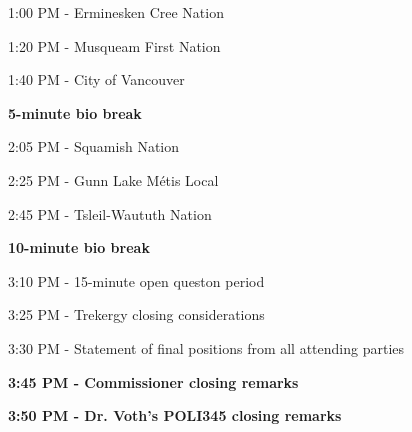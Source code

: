 \documentclass[12pt, letterpaper]{article}
\begin{document}
\vspace{12pt}

\hphantom{~~~~} 1:00 PM - Erminesken Cree Nation

\vspace{12pt}

\hphantom{~~~~} 1:20 PM - Musqueam First Nation

\vspace{12pt}

\hphantom{~~~~} 1:40 PM - City of Vancouver

\vspace{12pt}

{\bf 5-minute bio break}

\vspace{12pt}

\hphantom{~~~~} 2:05 PM - Squamish Nation

\vspace{12pt}

\hphantom{~~~~} 2:25 PM - Gunn Lake M\'{e}tis Local

\vspace{12pt}

\hphantom{~~~~} 2:45 PM - Tsleil-Waututh Nation

\vspace{12pt}

{\bf 10-minute bio break}

\vspace{12pt}

\hphantom{~~~~} 3:10 PM - 15-minute open queston period

\vspace{12pt}

\hphantom{~~~~} 3:25 PM - Trekergy closing considerations

\vspace{12pt}

\hphantom{~~~~} 3:30 PM - Statement of final positions from all attending parties

\vspace{12pt}

{\bf 3:45 PM - Commissioner closing remarks}

\vspace{12pt}

{\bf 3:50 PM - Dr. Voth's POLI345 closing remarks}
\end{document}
